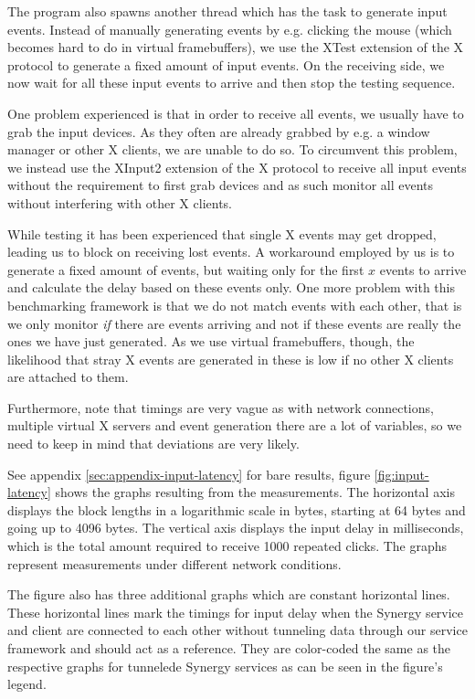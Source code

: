 The program also spawns another thread which has the task to generate input events.
Instead of manually generating events by e.g. clicking the mouse (which becomes hard to do in virtual framebuffers), we use the XTest extension of the X protocol to generate a fixed amount of input events.
On the receiving side, we now wait for all these input events to arrive and then stop the testing sequence.

One problem experienced is that in order to receive all events, we usually have to grab the input devices.
As they often are already grabbed by e.g. a window manager or other X clients, we are unable to do so.
To circumvent this problem, we instead use the XInput2 extension of the X protocol to receive all input events without the requirement to first grab devices and as such monitor all events without interfering with other X clients.

While testing it has been experienced that single X events may get dropped, leading us to block on receiving lost events.
A workaround employed by us is to generate a fixed amount of events, but waiting only for the first $x$ events to arrive and calculate the delay based on these events only.
One more problem with this benchmarking framework is that we do not match events with each other, that is we only monitor \emph{if} there are events arriving and not if these events are really the ones we have just generated.
As we use virtual framebuffers, though, the likelihood that stray X events are generated in these is low if no other X clients are attached to them.

Furthermore, note that timings are very vague as with network connections, multiple virtual X servers and event generation there are a lot of variables, so we need to keep in mind that deviations are very likely.

See appendix \ref{sec:appendix-input-latency} for bare results, figure \ref{fig:input-latency} shows the graphs resulting from the measurements.
The horizontal axis displays the block lengths in a logarithmic scale in bytes, starting at 64 bytes and going up to 4096 bytes.
The vertical axis displays the input delay in milliseconds, which is the total amount required to receive 1000 repeated clicks.
The graphs represent measurements under different network conditions.

The figure also has three additional graphs which are constant horizontal lines.
These horizontal lines mark the timings for input delay when the Synergy service and client are connected to each other without tunneling data through our service framework and should act as a reference.
They are color-coded the same as the respective graphs for tunnelede Synergy services as can be seen in the figure's legend.

